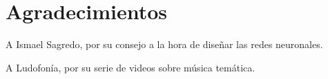 
\chapter*{Agradecimientos}
A Ismael Sagredo, por su consejo a la hora de diseñar las redes neuronales.

A Ludofonía, por su serie de videos sobre música temática.












